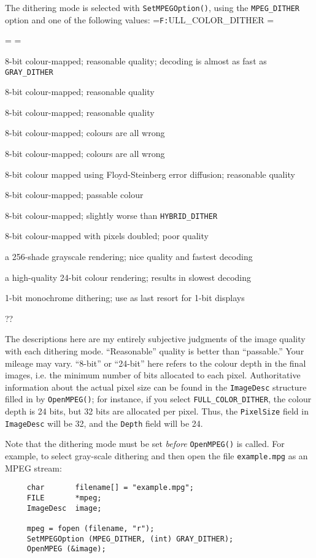 \documentclass[11pt]{article}
\newcommand{\code}[1]{\texttt{#1}}
\newcommand{\ttlabel}[1]{\texttt{#1:}\quad\hfil}
\newenvironment{ttdescription}[1] {\newbox\holder
  \setbox\holder=\hbox{\ttlabel#1} \dimen0=\wd\holder
 \begin{list}{}
   {\labelsep=-0.25in \rightmargin=0.25in \leftmargin=\dimen0
     \addtolength{\leftmargin}{0.25in}
  \labelwidth=\leftmargin
  \let\makelabel\ttlabel}}%
{\end{list}}
\begin{document}
The dithering mode is selected with \code{SetMPEGOption()}, using the
\code{MPEG\_DITHER} option and one of the following values:
\begin{ttdescription}{FULL\_COLOR\_DITHER}

\item[ORDERED\_DITHER] 8-bit colour-mapped; reasonable quality;
  decoding is almost as fast as \code{GRAY\_DITHER}
\item[ORDERED2\_DITHER] 8-bit colour-mapped; reasonable quality
\item[MBORDERED\_DITHER] 8-bit colour-mapped; reasonable quality
\item[FS4\_DITHER] 8-bit colour-mapped; colours are all wrong
\item[FS2\_DITHER] 8-bit colour-mapped; colours are all wrong
\item[FS2FAST\_DITHER] 8-bit colour mapped using Floyd-Steinberg error
  diffusion; reasonable quality
\item[HYBRID\_DITHER] 8-bit colour-mapped; passable colour
\item[HYBRID2\_DITHER] 8-bit colour-mapped; slightly worse than
  \code{HYBRID\_DITHER}
\item[Twox2\_DITHER] 8-bit colour-mapped with pixels doubled; poor
  quality
\item[GRAY\_DITHER] a 256-shade grayscale rendering; nice
  quality and fastest decoding
\item[FULL\_COLOR\_DITHER] a high-quality 24-bit colour rendering;
  results in slowest decoding
\item[MONO\_DITHER] 1-bit monochrome dithering; use as last resort for
  1-bit displays
\item[THRESHOLD\_DITHER] ??
\end{ttdescription}
The descriptions here are my entirely subjective judgments of the image
quality with each dithering mode.  ``Reasonable'' quality is better than
``passable.''  Your mileage may vary.  ``8-bit'' or ``24-bit'' here
refers to the colour depth in the final images, i.e. the minimum number
of bits allocated to each pixel.  Authoritative information about the
actual pixel size can be found in the \code{ImageDesc} structure filled
in by \code{OpenMPEG()}; for instance, if you select
\code{FULL\_COLOR\_DITHER}, the colour depth is 24 bits, but 32 bits are
allocated per pixel.  Thus, the \code{PixelSize} field in
\code{ImageDesc} will be 32, and the \code{Depth} field will be 24.

Note that the dithering mode must be set {\em before\/} \code{OpenMPEG()}
is called.  For example, to select gray-scale dithering and then open
the file \code{example.mpg} as an MPEG stream:
\begin{verbatim}
     char       filename[] = "example.mpg";
     FILE       *mpeg;
     ImageDesc  image;

     mpeg = fopen (filename, "r");
     SetMPEGOption (MPEG_DITHER, (int) GRAY_DITHER);
     OpenMPEG (&image);
\end{verbatim}
\end{document}
